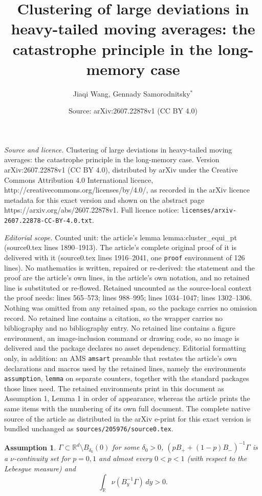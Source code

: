 \documentclass[10pt,a4paper]{amsart}
\title{Clustering of large deviations in heavy-tailed moving averages: the catastrophe principle in the long-memory case}
\author{Jiaqi Wang, Gennady Samorodnitsky$^*$}
\date{Source: arXiv:2607.22878v1 (CC BY 4.0)}
\newtheorem{assumption}{Assumption}
\newcommand{\R}{\mathbb{R}}
\newcommand{\RR}{\mathbb{R}}
\begin{document}
\maketitle

\noindent\emph{Source and licence.} Clustering of large deviations in heavy-tailed moving averages: the catastrophe principle in the long-memory case. Version arXiv:2607.22878v1 (CC BY 4.0), distributed by arXiv under the Creative Commons Attribution 4.0 International licence, http://creativecommons.org/licenses/by/4.0/, as recorded in the arXiv licence metadata for this exact version and shown on the abstract page https://arxiv.org/abs/2607.22878v1. Full licence notice: \texttt{licenses/arxiv-2607.22878-CC-BY-4.0.txt}.\par\smallskip

\noindent\textit{Editorial scope.} Counted unit: the article's lemma lemma:cluster\_equi\_pt (source0.tex lines 1890--1913). The article's complete original proof of it is delivered with it (source0.tex lines 1916--2041, one \texttt{proof} environment of 126 lines). No mathematics is written, repaired or re-derived: the statement and the proof are the article's own lines, in the article's own notation, and no retained line is substituted or re-flowed.  Retained uncounted as the source-local context the proof needs: lines 565--573; lines 988--995; lines 1034--1047; lines 1302--1306.  Nothing was omitted from any retained span, so the package carries no omission record.  No retained line contains a citation, so the wrapper carries no bibliography and no bibliography entry.  No retained line contains a figure environment, an image-inclusion command or drawing code, so no image is delivered and the package declares no asset dependency.  Editorial formatting only, in addition: an AMS \texttt{amsart} preamble that restates the article's own declarations and macros used by the retained lines, namely the environments \texttt{assumption}, \texttt{lemma} on separate counters, together with the standard packages those lines need.  The retained environments print in this document as Assumption 1, Lemma 1 in order of appearance, whereas the article prints the same items with the numbering of its own full document.  The complete native source of the article as distributed in the arXiv e-print for this exact version is bundled unchanged as \texttt{sources/205976/source0.tex}.
\begin{assumption}\label{ass:tail_measure}
$\Gamma \subset \RR^d \setminus
B_{\delta_0}(0)$ for some $\delta_0>0$,  $(pB_++(1-p)B_-)^{-1}\Gamma$ is a
$\nu$-continuity set for $p=0,1$ and almost every $0< p< 1$ (with respect to
the Lebesgue measure) and
$$
\int_\R \nu ( B_y^{-1}\Gamma)\, dy>0. 
$$
\end{assumption}
\end{document}
